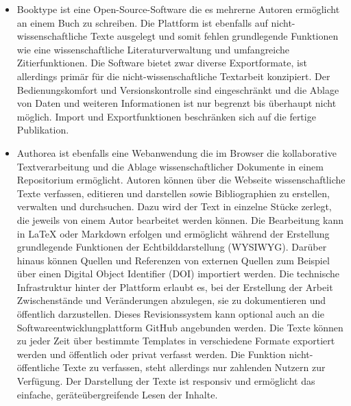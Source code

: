 \begin{itemize}
\item Booktype ist eine Open-Source-Software die es mehrerne Autoren ermöglicht an einem Buch zu schreiben. Die Plattform ist ebenfalls auf nicht-wissenschaftliche Texte ausgelegt und somit fehlen grundlegende Funktionen wie eine wissenschaftliche Literaturverwaltung und umfangreiche Zitierfunktionen. Die Software bietet zwar diverse Exportformate, ist allerdings primär für die nicht-wissenschaftliche Textarbeit konzipiert. Der Bedienungskomfort und Versionskontrolle sind eingeschränkt und die Ablage von Daten und weiteren Informationen ist nur begrenzt bis überhaupt nicht möglich. Import und Exportfunktionen beschränken sich auf die fertige Publikation.
\item Authorea ist ebenfalls eine Webanwendung die im Browser die kollaborative Textverarbeitung  und die Ablage wissenschaftlicher Dokumente in einem Repositorium ermöglicht. Autoren können über die Webseite wissenschaftliche Texte verfassen, editieren und darstellen sowie Bibliographien zu erstellen, verwalten und durchsuchen. Dazu wird der Text in einzelne Stücke zerlegt, die jeweils von einem Autor bearbeitet werden können. Die Bearbeitung kann in LaTeX oder Markdown erfolgen und ermöglicht während der Erstellung grundlegende Funktionen der Echtbilddarstellung (WYSIWYG). Darüber hinaus können Quellen und Referenzen von externen Quellen zum Beispiel über einen Digital Object Identifier (DOI) importiert werden. Die technische Infrastruktur hinter der Plattform erlaubt es, bei der Erstellung der Arbeit Zwischenstände und Veränderungen abzulegen, sie zu dokumentieren und öffentlich darzustellen. Dieses Revisionssystem kann optional auch an die Softwareentwicklungplattform GitHub angebunden werden. Die Texte können zu jeder Zeit über bestimmte Templates in verschiedene Formate exportiert werden und öffentlich oder privat verfasst werden. Die Funktion nicht-öffentliche Texte zu verfassen, steht allerdings nur zahlenden Nutzern zur Verfügung. Der Darstellung der Texte ist responsiv und ermöglicht das einfache, geräteübergreifende Lesen der Inhalte.

\end{itemize}
